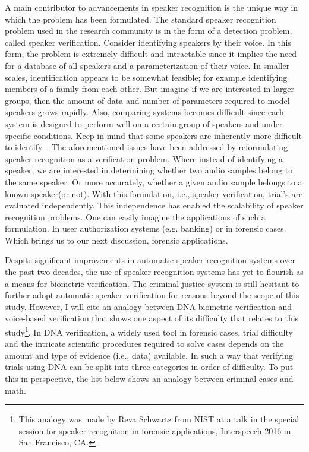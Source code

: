 A main contributor to advancements in speaker recognition is the unique way in which the problem has been formulated. 
The standard speaker recognition problem used in the research community is in the form of a detection problem, called speaker verification. 
Consider identifying speakers by their voice. 
In this form, the problem is extremely difficult and intractable since it implies the need for a database of all speakers and a parameterization of their voice. 
In smaller scales, identification appears to be somewhat feasible; for example identifying members of a family from each other. 
But imagine if we are interested in larger groups, then the amount of data and number of parameters required to model speakers grows rapidly. 
Also, comparing systems becomes difficult since each system is designed to perform well on a certain group of speakers and under specific conditions. 
Keep in mind that some speakers are inherently more difficult to identify~\cite{farmmodel}.
The aforementioned issues have been addressed by reformulating speaker recognition as a verification problem. 
Where instead of identifying a speaker, we are interested in determining whether two audio samples belong to the same speaker. 
Or more accurately, whether a given audio sample belongs to a known speaker(or not). 
With this formulation, i.e., speaker verification, trial's are evaluated independently. 
This independence has enabled the scalability of speaker recognition problems. 
One can easily imagine the applications of such a formulation. 
In user authorization systems (e.g. banking) or in forensic cases. 
Which brings us to our next discussion, forensic applications. 

Despite significant improvements in automatic speaker recognition systems over the past two decades, the use of speaker recognition systems has yet to flourish as a means for biometric verification. 
The criminal justice system is still hesitant to further adopt automatic speaker verification for reasons beyond the scope of this study. 
However, I will cite an analogy between DNA biometric verification and voice-based verification that shows one aspect of its difficulty that relates to this study\footnote{This analogy was made by Reva Schwartz from NIST at a talk in the special session for speaker recognition in forensic applications, Interspeech 2016 in San Francisco, CA.}. 
In DNA verification, a widely used tool in forensic cases, trial difficulty and the intricate scientific procedures required to solve cases depends on the amount and type of evidence (i.e., data) available. 
In such a way that verifying trials using DNA can be split into three categories in order of difficulty. To put this in perspective, the list below shows an analogy between criminal cases and math. 

